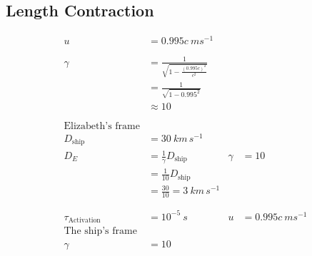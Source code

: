 \documentclass[12pt]{article}
\begin{document}
\subsection{Length Contraction}
\begin{align*}
	u                        & = 0.995 c ~ms^{-1}                                                                              \\
	\phantom{=}                                                                                                                \\
	\gamma                   & = \frac{1}{\sqrt{1 - \frac{(0.995c)^2}{c^2}}}                                                   \\
	                         & = \frac{1}{\sqrt{1 - 0.995^2}}                                                                  \\
	                         & \approx 10                                                                                      \\
	\phantom{=}                                                                                                                \\
	\text{Elizabeth's frame} &                                                                                                 \\
	D_\text{ship}            & = 30 ~ km \, s^{-1}                                                                             \\
	D_E                      & = \frac{1}{\gamma} D_\text{ship}              & \gamma  & = 10                                  \\
	                         & = \frac{1}{10} D_\text{ship}                                                                    \\
	                         & = \frac{30}{10} = 3 ~ km \, s^{-1}                                                              \\
	\phantom{=}                                                                                                                \\
	\tau_\text{Activation}   & = 10^{-5} ~s                                  & u       & = 0.995 c ~ms^{-1}                    \\
	\text{The ship's frame}  &                                                                                                 \\
	\gamma                   & = 10                                                                                            \\

\end{align*}
\end{document}

